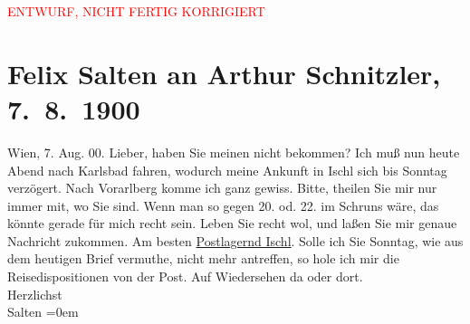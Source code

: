 
\begin{center}
            \textcolor{red}{ENTWURF, NICHT FERTIG KORRIGIERT}
                      \end{center}
            
         \renewcommand{\erwaehnteOrte}{Orte: Bad Ischl, Karlsbad, Pressbaum, Schruns, Vorarlberg, Wien}
         \renewcommand{\erwaehnteWerke}{}
               \section[Felix Salten an Arthur Schnitzler, 7. 8. 1900]{ Felix Salten an Arthur Schnitzler, 7. 8. 1900}\nopagebreak{}\rehead{ }\begin{ledgroupsized}[t]{13cm}\normalsize\beginnumbering \toendnotes[C]{\smallbreak\pagebreak[2]} 
\toendnotes[C]{\smallbreak}\pstart
           \raggedleft{}{\pb}Wien, 7. Aug. 00.\pend
           \pstart
           Lieber, haben Sie meinen \label{K_L03308-1v}\label{K_L03308-1h} nicht bekommen? Ich muß nun heute Abend
               nach Karlsbad fahren, wodurch meine Ankunft in Ischl sich bis Sonntag verzögert.
               Nach Vorarlberg komme ich ganz gewiss. Bitte, theilen
               Sie mir nur immer mit, wo Sie sind. Wenn man so gegen 20. od.
               22. im Schruns wäre, das könnte gerade
               für mich recht sein. \pend
           \pstart
           {\pb}Leben Sie recht wol, und laßen Sie mir genaue Nachricht zukommen. Am
               besten \uline{Postlagernd Ischl}.\pend
           \pstart
           Solle ich Sie Sonntag, wie aus dem heutigen Brief vermuthe, nicht mehr antreffen, so
               hole ich mir die Reisedispositionen von der Post.\pend
           \pstart
           Auf Wiedersehen da oder
               dort.{\\[\baselineskip]}Herzlichst{\\[\baselineskip]}\spacefill\mbox{Salten}\pend
           \leftskip=0em{}
         
         \endnumbering{}\end{ledgroupsized}\begin{anhang}\end{anhang}\newcommand{\dateiname}{L03308}\newcommand{\titel}{Felix Salten an Arthur Schnitzler, 7. 8. 1900}\newcommand{\editorInnen}{Martin Anton Müller und Laura Untner}
      